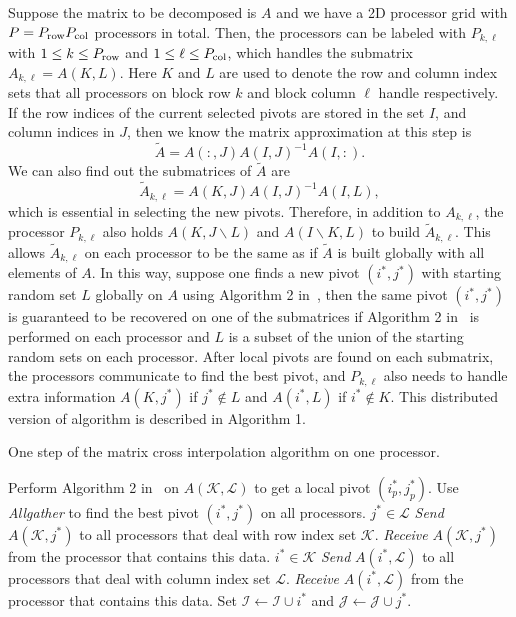 \documentclass[11pt,a4paper,review]{siamart220329}
\begin{document}
Suppose the matrix to be decomposed is $A$ and we have a 2D processor grid with $P = P_{\rm row}P_{\rm col}$ processors in total. Then, the processors can be labeled with $P_{k,\ell}$ with $1 \le k \le P_{\rm row}$ and $1 \le \ell \le P_{\rm col}$, which handles the submatrix $A_{k,\ell} = A(K,L)$. Here $K$ and $L$ are used to denote the row and column index sets that all processors on block row $k$ and block column $\ell$ handle respectively. If the row indices of the current selected pivots are stored in the set $I$, and column indices in $J$, then we know the matrix approximation at this step is 
\[ \tilde{A} = A(:,J)A(I,J)^{-1}A(I,:). \]
We can also find out the submatrices of $\tilde{A}$ are
\[ \tilde{A}_{k,\ell} =  A(K,J)A(I,J)^{-1}A(I,L), \]
which is essential in selecting the new pivots. Therefore, in addition to $A_{k,\ell}$, the processor $P_{k,\ell}$ also holds $A(K,J\backslash L)$ and $A(I \backslash K,L)$ to build $\tilde{A}_{k,\ell}$. This allows $\tilde{A}_{k,\ell}$ on each processor to be the same as if $\tilde{A}$ is built globally with all elements of $A$. In this way, suppose one finds a new pivot $(i^*,j^*)$ with starting random set $L$ globally on $A$ using Algorithm 2 in~\cite{dolgov2020parallel}, then the same pivot $(i^*,j^*)$ is guaranteed to be recovered on one of the submatrices if Algorithm 2 in~\cite{dolgov2020parallel} is performed on each processor and $L$ is a subset of the union of the starting random sets on each processor. After local pivots are found on each submatrix, the processors communicate to find the best pivot, and $P_{k,\ell}$ also needs to handle extra information $A(K,j^*)$ if $j^* \notin L$ and $A(i^*,L)$ if $i^* \notin K$. This distributed version of algorithm is described in Algorithm 1.

\begin{algorithm}
\caption{One step of the matrix cross interpolation algorithm on one processor.}
\begin{algorithmic}[1]
\label{alg:1}
\State Perform Algorithm 2 in~\cite{dolgov2020parallel} on $A(\mathcal{K},\mathcal{L})$ to get a local pivot $(i^*_p,j^*_p)$.
\State Use \textit{Allgather} to find the best pivot $(i^*,j^*)$ on all processors.
\If $j^* \in \mathcal{L}$
\State \textit{Send} $A(\mathcal{K},j^*)$ to all processors that deal with row index set $\mathcal{K}$.
\Else
\State \textit{Receive} $A(\mathcal{K},j^*)$ from the processor that contains this data.
\EndIf
\If $i^* \in \mathcal{K}$
\State \textit{Send} $A(i^*,\mathcal{L})$ to all processors that deal with column index set $\mathcal{L}$.
\Else
\State \textit{Receive} $A(i^*,\mathcal{L})$ from the processor that contains this data.
\EndIf
\State Set $\mathcal{I} \leftarrow \mathcal{I}\cup i^*$ and $\mathcal{J} \leftarrow \mathcal{J}\cup j^*$.
\end{algorithmic}   
\end{algorithm}
\end{document}

